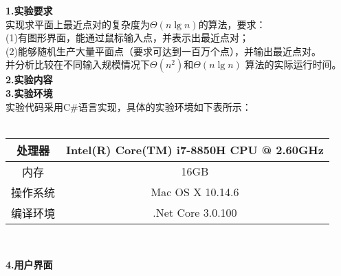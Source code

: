 \documentclass[a4paper]{article}
\begin{document}
\courseheader
{}

\info

\begin{enumerate}
  \setlength{\itemsep}{3\parskip}
  \textbf{1.实验要求}\\
  实现求平面上最近点对的复杂度为$\Theta(n\lg n)$的算法，要求：\\
  \indent (1)有图形界面，能通过鼠标输入点，并表示出最近点对；\\
    (2)能够随机生产大量平面点（要求可达到一百万个点），并输出最近点对。\\
  并分析比较在不同输入规模情况下$\Theta(n^2)$和$\Theta(n\lg n)$
  算法的实际运行时间。\\
  \bigskip
  \textbf{2.实验内容}\\

  \textbf{3.实验环境}\\
  实验代码采用C\#语言实现，具体的实验环境如下表所示：\\~\\
  \begin{tabular}{c|c}
    \hline\hline
    处理器 & Intel(R) Core(TM) i7-8850H CPU @ 2.60GHz \\ \hline
    内存 & 16GB\\ \hline
    操作系统& Mac OS X 10.14.6\\ \hline
    编译环境& .Net Core 3.0.100\\
    \hline\hline
  \end{tabular}\\
  \bigskip
  
  \bigskip
  \textbf{4.用户界面}
\end{enumerate}
\end{document}
